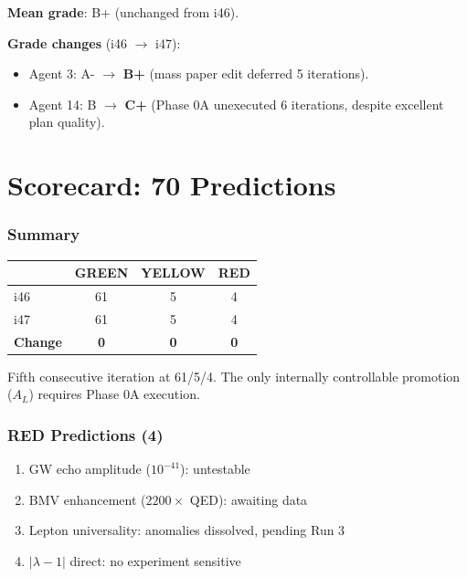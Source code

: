 \documentclass[11pt,a4paper]{article}
\newcommand{\GREEN}{\textcolor{dfdgreen}{\textbf{GREEN}}}
\newcommand{\YELLOW}{\textcolor{dfdyellow}{\textbf{YELLOW}}}
\newcommand{\RED}{\textcolor{dfdred}{\textbf{RED}}}
\begin{document}
\textbf{Mean grade}: B+ (unchanged from i46).

\textbf{Grade changes} (i46 $\to$ i47):
\begin{itemize}
\item Agent 3: A- $\to$ \textbf{B+} (mass paper edit deferred 5 iterations).
\item Agent 14: B $\to$ \textbf{C+} (Phase 0A unexecuted 6 iterations, despite excellent plan quality).
\end{itemize}


\part{Scorecard: 70 Predictions}

\section{Summary}

\begin{center}
\begin{tabular}{lccc}
\toprule
& \textbf{\GREEN} & \textbf{\YELLOW} & \textbf{\RED} \\
\midrule
i46 & 61 & 5 & 4 \\
i47 & 61 & 5 & 4 \\
\textbf{Change} & \textbf{0} & \textbf{0} & \textbf{0} \\
\bottomrule
\end{tabular}
\end{center}

Fifth consecutive iteration at 61/5/4. The only internally controllable promotion ($A_L$) requires Phase 0A execution.

\section{RED Predictions (4)}

\begin{enumerate}
\item GW echo amplitude ($10^{-41}$): untestable
\item BMV enhancement ($2200\times$ QED): awaiting data
\item Lepton universality: anomalies dissolved, pending Run 3
\item $|\lambda-1|$ direct: no experiment sensitive
\end{enumerate}
\end{document}
